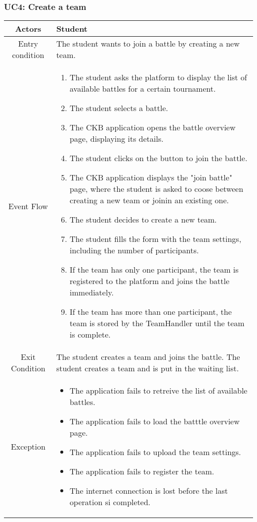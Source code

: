 \documentclass[a4paper, 11pt, titlepage]{article}
\begin{document}
\clearpage

\subsubsection*{UC4: Create a team}

\begin{center}
    \begin{tabularx}{\linewidth} {|c|X|}
        \hline 
        Actors & Student\\
        \hline 
        Entry condition & The student wants to join a battle by creating a new team.\\
        \hline 
        Event Flow &
        \begin{enumerate}
            \item The student asks the platform to display the list of available battles 
            for a certain tournament.
            \item The student selects a battle.
            \item The CKB application opens the battle overview page, displaying its details.
            \item The student clicks on the button to join the battle.
            \item The CKB application displays the "join battle" page, where the student is asked to coose between creating a new team or joinin an 
            existing one.
            \item The student decides to create a new team.
            \item The student fills the form with the team settings, including the number of participants.
            \item If the team has only one participant, the team is registered to the platform and joins the battle immediately.
            \item If the team has more than one participant, the team is stored by the TeamHandler until the team is complete.
        \end{enumerate}\\
        \hline 
        Exit Condition & 
        The student creates a team and joins the battle.
        The student creates a team and is put in the waiting list.\\
        \hline 
        Exception & 
        \begin{itemize}
            \item The application fails to retreive the list of available battles.
            \item The application fails to load the batttle overview page.
            \item The application fails to upload the team settings.
            \item The application fails to register the team.
            \item The internet connection is lost before the last operation si completed.
        \end{itemize}\\
        \hline
    \end{tabularx}
\end{center}
\end{document}
